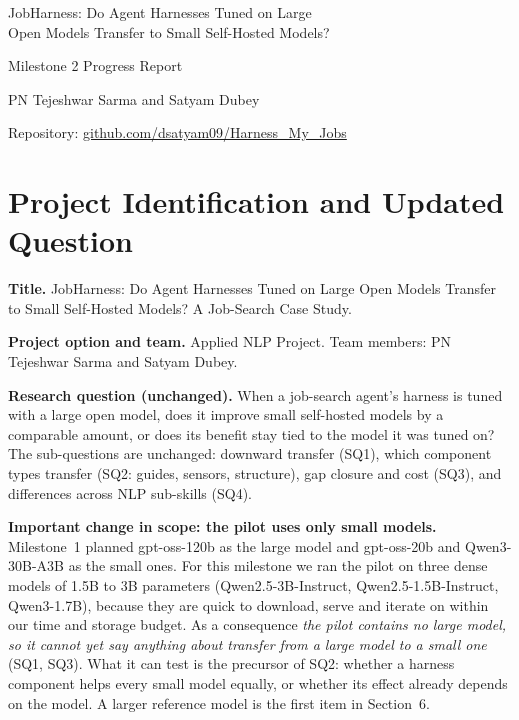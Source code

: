 \documentclass[11pt]{article}
\newcommand{\repo}{\href{https://github.com/dsatyam09/Harness_My_Jobs}{github.com/dsatyam09/Harness\_My\_Jobs}}
\begin{document}
\begin{center}
  {\LARGE JobHarness: Do Agent Harnesses Tuned on Large\\[2pt] Open Models Transfer to Small Self-Hosted Models?\par}

  \vspace{6pt}
  {\large Milestone 2 Progress Report\par}
  \vspace{8pt}
  {\large PN Tejeshwar Sarma and Satyam Dubey\par}
  \vspace{4pt}
  Repository: \repo
\end{center}
\vspace{6pt}

\section{Project Identification and Updated Question}

\textbf{Title.} JobHarness: Do Agent Harnesses Tuned on Large Open Models Transfer to Small Self-Hosted Models? A Job-Search Case Study.

\textbf{Project option and team.} Applied NLP Project. Team members: PN Tejeshwar Sarma and Satyam Dubey.

\textbf{Research question (unchanged).} When a job-search agent's harness is tuned with a large open model, does it improve small self-hosted models by a comparable amount, or does its benefit stay tied to the model it was tuned on? The sub-questions are unchanged: downward transfer (SQ1), which component types transfer (SQ2: guides, sensors, structure), gap closure and cost (SQ3), and differences across NLP sub-skills (SQ4).

\textbf{Important change in scope: the pilot uses only small models.} Milestone~1 planned gpt-oss-120b as the large model and gpt-oss-20b and Qwen3-30B-A3B as the small ones. For this milestone we ran the pilot on three dense models of 1.5B to 3B parameters (Qwen2.5-3B-Instruct, Qwen2.5-1.5B-Instruct, Qwen3-1.7B), because they are quick to download, serve and iterate on within our time and storage budget. As a consequence \emph{the pilot contains no large model, so it cannot yet say anything about transfer from a large model to a small one} (SQ1, SQ3). What it can test is the precursor of SQ2: whether a harness component helps every small model equally, or whether its effect already depends on the model. A larger reference model is the first item in Section~6.
\end{document}
